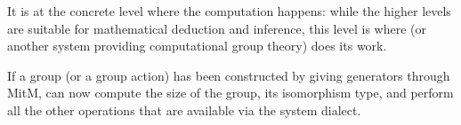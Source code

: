 It is at the concrete level where the computation happens: while the higher levels
are suitable for mathematical deduction and inference, this level is where \GAP
(or another system providing computational group theory) does its work.

If a group (or a group action) has been constructed by giving generators
through MitM, \GAP can now compute the size of the group, its isomorphism type,
and perform all the other operations that are available via the \GAP system
dialect.

%







